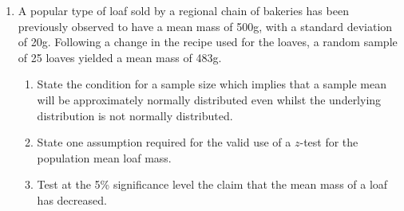 \documentclass[
  11pt,
]{book}
\begin{document}
\begin{enumerate}
    \begin{enumerate}
        \item Perform a $z$-test to assess the evidence, at the 5\% level of significance, that the mean distance players are covering in a game this season has changed.
        \item Explain why the sample size helped enable the use of a $z$-test for this data.
    \end{enumerate}
    \item A popular type of loaf sold by a regional chain of bakeries has been previously observed to have a mean mass of 500g, with a standard deviation of 20g. Following a change in the recipe used for the loaves, a random sample of 25 loaves yielded a mean mass of 483g. 
    \begin{enumerate}
        \item State the condition for a sample size which implies that a sample mean will be approximately normally distributed even whilst the underlying distribution is not normally distributed.
        \item State one assumption required for the valid use of a $z$-test for the population mean loaf mass.
        \item Test at the 5\% significance level the claim that the mean mass of a loaf has decreased.
    \end{enumerate}
\end{enumerate}

\pagebreak
\end{document}
